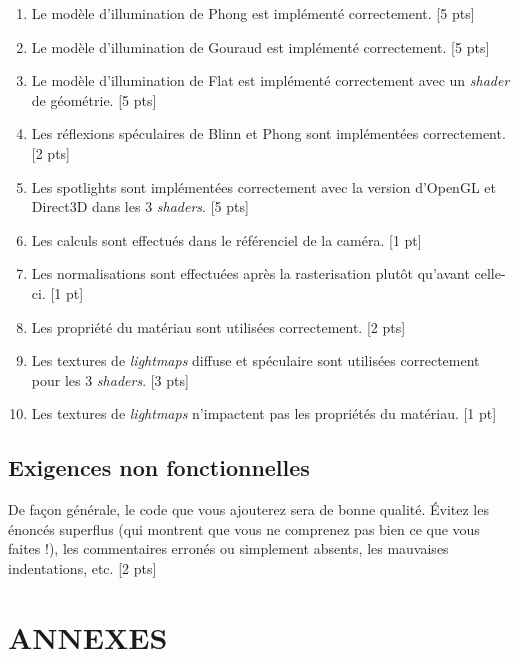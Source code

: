 \documentclass{article}[letterpaper, 11pt]
\begin{document}
\begin{enumerate}[label={E\arabic*.}, resume]
	\item Le modèle d'illumination de Phong est implémenté correctement. [5 pts]
	\item Le modèle d'illumination de Gouraud est implémenté correctement. [5 pts]
	\item Le modèle d'illumination de Flat est implémenté correctement avec un \textit{shader} de géométrie. [5 pts]
	\item Les réflexions spéculaires de Blinn et Phong sont implémentées correctement. [2 pts]
	\item Les spotlights sont implémentées correctement avec la version d'OpenGL et Direct3D dans les 3 \textit{shaders}. [5 pts]
	\item Les calculs sont effectués dans le référenciel de la caméra. [1 pt]
	\item Les normalisations sont effectuées après la rasterisation plutôt qu'avant celle-ci. [1 pt]
	\item Les propriété du matériau sont utilisées correctement. [2 pts]
	\item Les textures de \textit{lightmaps} diffuse et spéculaire sont utilisées correctement pour les 3 \textit{shaders}. [3 pts]
	\item Les textures de \textit{lightmaps} n'impactent pas les propriétés du matériau. [1 pt]
\end{enumerate}

\subsection{Exigences non fonctionnelles}
De façon générale, le code que vous ajouterez sera de bonne qualité. Évitez les énoncés superflus
(qui montrent que vous ne comprenez pas bien ce que vous faites !), les commentaires erronés ou
simplement absents, les mauvaises indentations, etc. [2 pts]

\newpage
\section*{ANNEXES}

\setcounter{section}{0}
\renewcommand{\thesection}{\Alph{section}}
\end{document}
